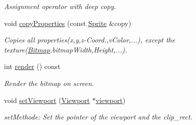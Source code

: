 \begin{DoxyCompactItemize}
\begin{DoxyCompactList}\small\item\em Assignment operator with deep copy. \item\end{DoxyCompactList}\item 
void \hyperlink{class_f2_c_1_1_sprite_a33d27869102b12705666a1712d9f645d}{copyProperties} (const \hyperlink{class_f2_c_1_1_sprite}{Sprite} \&copy)
\begin{DoxyCompactList}\small\item\em Copies all properties(x,y,z-\/Coord.,vColor,...), except the texture(\hyperlink{class_f2_c_1_1_bitmap}{Bitmap},bitmapWidth,Height,...). \item\end{DoxyCompactList}\item 
int \hyperlink{class_f2_c_1_1_sprite_a53505010baf74857c67c82150802b297}{render} () const 
\begin{DoxyCompactList}\small\item\em Render the bitmap on screen. \item\end{DoxyCompactList}\item 
void \hyperlink{class_f2_c_1_1_sprite_a8bc4649a6100c8b26c67c94e79497289}{setViewport} (\hyperlink{class_f2_c_1_1_viewport}{Viewport} $\ast$\hyperlink{class_f2_c_1_1_sprite_a66cc8d6922dcbf4331b360800ba47177}{viewport})
\begin{DoxyCompactList}\small\item\em setMethode: Set the pointer of the viewport and the clip\_\-rect. \item\end{DoxyCompactList}\end{DoxyCompactItemize}
